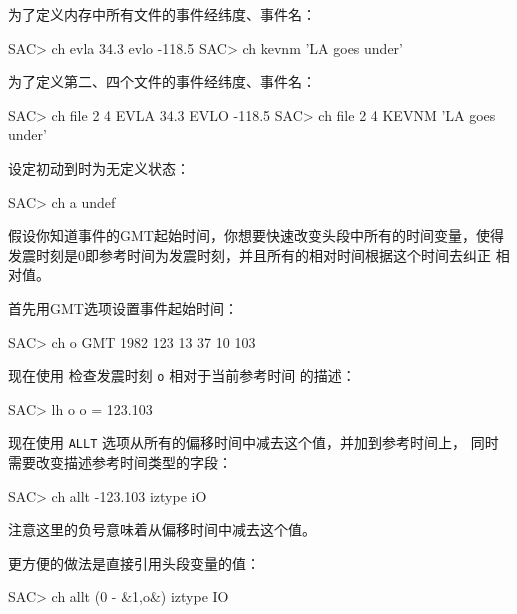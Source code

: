为了定义内存中所有文件的事件经纬度、事件名：
\begin{SACCode}
SAC> ch evla 34.3 evlo -118.5
SAC> ch kevnm 'LA goes under'
\end{SACCode}

为了定义第二、四个文件的事件经纬度、事件名：
\begin{SACCode}
SAC> ch file 2 4 EVLA 34.3 EVLO -118.5
SAC> ch file 2 4 KEVNM 'LA goes under'
\end{SACCode}

设定初动到时为无定义状态：
\begin{SACCode}
SAC> ch a undef
\end{SACCode}

假设你知道事件的GMT起始时间，你想要快速改变头段中所有的时间变量，使得
发震时刻是0即参考时间为发震时刻，并且所有的相对时间根据这个时间去纠正
相对值。

首先用GMT选项设置事件起始时间：
\begin{SACCode}
SAC> ch o GMT 1982 123 13 37 10 103
\end{SACCode}
现在使用  检查发震时刻 \texttt{o} 相对于当前参考时间
的描述：
\begin{SACCode}
SAC> lh o
 o = 123.103
\end{SACCode}
现在使用 \texttt{ALLT} 选项从所有的偏移时间中减去这个值，并加到参考时间上，
同时需要改变描述参考时间类型的字段：
\begin{SACCode}
SAC> ch allt -123.103 iztype iO
\end{SACCode}
注意这里的负号意味着从偏移时间中减去这个值。

更方便的做法是直接引用头段变量的值：
\begin{SACCode}
SAC> ch allt (0 - &1,o&) iztype IO
\end{SACCode}
